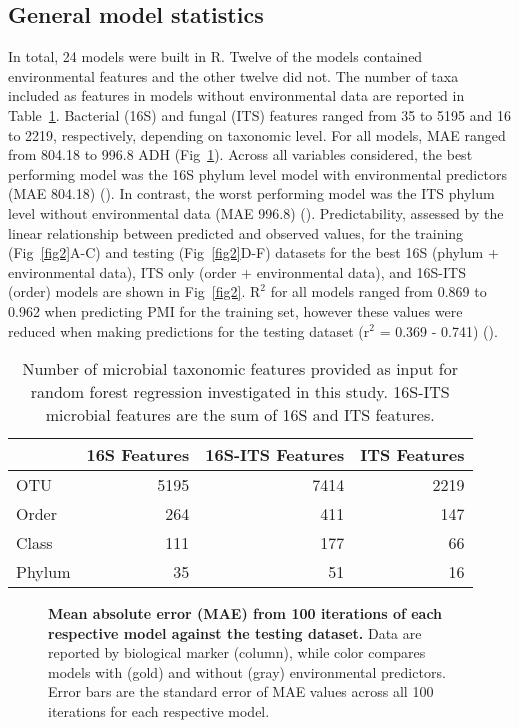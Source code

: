 \documentclass[
  10pt,
  letterpaper,
]{article}
\begin{document}
\subsection{General model statistics}\label{general-model-statistics}

In total, 24 models were built in R. Twelve of the models contained
environmental features and the other twelve did not. The number of taxa
included as features in models without environmental data are reported
in Table~\ref{tbl-numfeatures}. Bacterial (16S) and fungal (ITS)
features ranged from 35 to 5195 and 16 to 2219, respectively, depending
on taxonomic level. For all models, MAE ranged from 804.18 to 996.8 ADH
(Fig~\ref{fig1}). Across all variables considered, the best performing
model was the 16S phylum level model with environmental predictors (MAE
804.18) (). In contrast, the worst performing model
was the ITS phylum level without environmental data (MAE 996.8)
(). Predictability, assessed by the linear
relationship between predicted and observed values, for the training
(Fig~\ref{fig2}A-C) and testing (Fig~\ref{fig2}D-F) datasets for the
best 16S (phylum + environmental data), ITS only (order + environmental
data), and 16S-ITS (order) models are shown in Fig~\ref{fig2}.
\(\mathrm{R}^2\) for all models ranged from 0.869 to 0.962 when
predicting PMI for the training set, however these values were reduced
when making predictions for the testing dataset (\(\mathrm{r}^2\) =
0.369 - 0.741) ().

\begin{longtable}[]{@{}lrrr@{}}

\caption{\label{tbl-numfeatures}Number of microbial taxonomic features
provided as input for random forest regression investigated in this
study. 16S-ITS microbial features are the sum of 16S and ITS features.}

\tabularnewline

\toprule\noalign{}
& 16S Features & 16S-ITS Features & ITS Features \\
\midrule\noalign{}
\endhead
\bottomrule\noalign{}
\endlastfoot
OTU & 5195 & 7414 & 2219 \\
Order & 264 & 411 & 147 \\
Class & 111 & 177 & 66 \\
Phylum & 35 & 51 & 16 \\

\end{longtable}

\begin{figure}[!h]
\caption{{\bf Mean absolute error (MAE) from 100 iterations of each respective model against the testing dataset.}
Data are reported by biological marker (column), while color compares models with (gold) and without (gray) environmental predictors. Error bars are the standard error of MAE values across all 100 iterations for each respective model.}
\label{fig1}
\end{figure}
\end{document}
